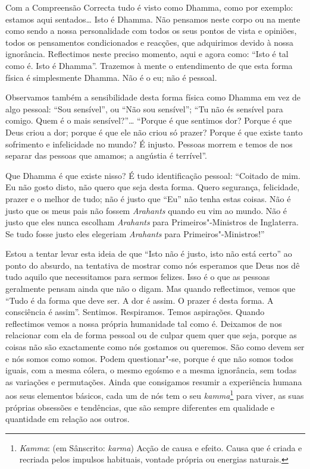 Com a Compreensão Correcta tudo é visto como Dhamma, como por exemplo: estamos
aqui sentados\ldots{} Isto é Dhamma. Não pensamos neste corpo ou na mente como
sendo a nossa personalidade com todos os seus pontos de vista e opiniões, todos
os pensamentos condicionados e reacções, que adquirimos devido à nossa
ignorância. Reflectimos neste preciso momento, aqui e agora como: “Isto é tal
como é. Isto é Dhamma”. Trazemos à mente o entendimento de que esta forma física
é simplesmente Dhamma. Não é o eu; não é pessoal.

Observamos também a sensibilidade desta forma física como Dhamma em vez de algo
pessoal: “Sou sensível”, ou “Não sou sensível”; “Tu não és sensível para comigo.
Quem é o mais sensível?”\ldots{} “Porque é que sentimos dor? Porque é que Deus
criou a dor; porque é que ele não criou só prazer? Porque é que existe tanto
sofrimento e infelicidade no mundo? É injusto. Pessoas morrem e temos de nos
separar das pessoas que amamos; a angústia é terrível”.

Que Dhamma é que existe nisso? É tudo identificação pessoal: “Coitado de mim. Eu
não gosto disto, não quero que seja desta forma. Quero segurança, felicidade,
prazer e o melhor de tudo; não é justo que “Eu” não tenha estas coisas. Não é
justo que os meus pais não fossem \emph{Arahants} quando eu vim ao mundo. Não é
justo que eles nunca escolham \emph{Arahants} para Primeiros"-Ministros de
Inglaterra. Se tudo fosse justo eles elegeriam \emph{Arahants} para
Primeiros"-Ministros!”

Estou a tentar levar esta ideia de que “Isto não é justo, isto não está certo”
ao ponto do absurdo, na tentativa de mostrar como nós esperamos que Deus nos dê
tudo aquilo que necessitamos para sermos felizes. Isso é o que as pessoas
geralmente pensam ainda que não o digam. Mas quando reflectimos, vemos que “Tudo
é da forma que deve ser. A dor é assim. O prazer é desta forma. A consciência é
assim”. Sentimos. Respiramos. Temos aspirações. Quando reflectimos vemos a nossa
própria humanidade tal como é. Deixamos de nos relacionar com ela de forma
pessoal ou de culpar quem quer que seja, porque as coisas não são exactamente
como nós gostamos ou queremos. São como devem ser e nós somos como somos. Podem
questionar"-se, porque é que não somos todos iguais, com a mesma cólera, o mesmo
egoísmo e a mesma ignorância, sem todas as variações e permutações. Ainda que
consigamos resumir a experiência humana aos seus elementos básicos, cada um de
nós tem o seu \emph{kamma}\footnote{%
  \emph{Kamma}: (em Sânscrito: \emph{karma}) Acção de causa e efeito. Causa que
  é criada e recriada pelos impulsos habituais, vontade própria ou energias
  naturais.} para viver, as suas próprias obsessões e tendências, que são sempre
diferentes em qualidade e quantidade em relação aos outros.

